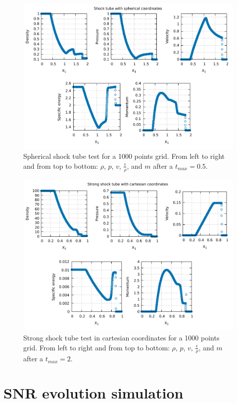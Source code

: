 \documentclass{article}
\begin{document}
\begin{figure}[H]
	\centering
	\includegraphics[width=0.8 \linewidth]{spheshock.pdf}
	\caption{Spherical shock tube test for a 1000 points grid. From left to right and from top to bottom: $\rho$, $p$, $v$, $\frac{\epsilon}{\rho}$, and $m$ after a $t_{max}=0.5$.}

	\label{fig:spheshock1000}
\end{figure}
\begin{figure}[H]
	\centering
	\includegraphics[width=0.8 \linewidth]{strongshocktube.pdf}
	\caption{Strong shock tube test in cartesian coordinates for a 1000 points grid. From left to right and from top to bottom: $\rho$, $p$, $v$, $\frac{\epsilon}{\rho}$, and $m$ after a $t_{max}=2$.}

	\label{fig:strongshock}
\end{figure}
\section{SNR evolution simulation}
\end{document}
